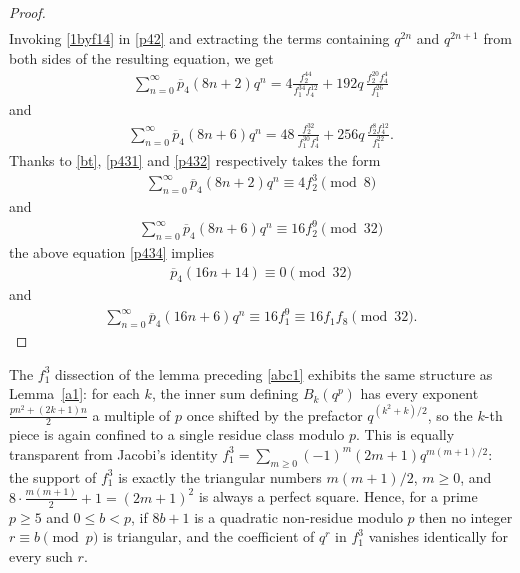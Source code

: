 \documentclass[11pt, reqno]{amsart}
\numberwithin{equation}{section}
\begin{document}
\begin{proof}
\begin{align}
		\end{align}
		Invoking \eqref{1byf14} in \eqref{p42} and extracting the terms containing $q^{2n}$ and $q^{2n+1}$ from both sides of the resulting equation, we get
		\begin{align}
			\sum_{n=0}^{\infty}\overline{p}_{4}(8n+2)q^n=4\frac{f_2^{44}}{f_1^{34}f_4^{12}}+
			192q\,\frac{f_2^{20}f_4^{4}}{f_1^{26}}\label{p431}
		\end{align}
		and
		\begin{align}
			\sum_{n=0}^{\infty}\overline{p}_{4}(8n+6)q^n=48\,\frac{f_2^{32}}{f_1^{30}f_4^{4}}+
			256q\,\frac{f_2^{8}f_4^{12}}{f_1^{22}}.\label{p432}
		\end{align}
		Thanks to \eqref{bt}, \eqref{p431} and \eqref{p432} respectively takes the form
		\begin{align}
			\sum_{n=0}^{\infty}\overline{p}_{4}(8n+2)q^n\equiv4f_2^{3}\pmod{8}\label{p433}
		\end{align}
		and 
		\begin{align}
			\sum_{n=0}^{\infty}\overline{p}_{4}(8n+6)q^n\equiv16f_2^{9}\pmod{32}\label{p434}
		\end{align}
		the above equation \eqref{p434} implies 
		\begin{align}
			\overline{p}_{4}(16n+14)\equiv0\pmod{32}\label{p435}
		\end{align}
		and
		\begin{align}
			\sum_{n=0}^{\infty}\overline{p}_{4}(16n+6)q^n\equiv 16f_1^{9}\equiv 16f_1f_8\pmod{32}.\label{p436}
		\end{align}
		
	\end{proof}
	
	The $f_1^3$ dissection of the lemma preceding \eqref{abc1} exhibits the same
	structure as Lemma~\ref{a1}: for each $k$, the inner sum defining $B_k(q^p)$ has
	every exponent $\frac{pn^2+(2k+1)n}{2}$ a multiple of $p$ once shifted by the
	prefactor $q^{(k^2+k)/2}$, so the $k$-th piece is again confined to a single
	residue class modulo $p$. This is equally transparent from Jacobi's identity
	$f_1^3=\sum_{m\ge0}(-1)^m(2m+1)q^{m(m+1)/2}$: the support of $f_1^3$ is exactly
	the triangular numbers $m(m+1)/2$, $m\ge0$, and $8\cdot\frac{m(m+1)}{2}+1=(2m+1)^2$
	is always a perfect square. Hence, for a prime $p\ge5$ and $0\le b<p$, if $8b+1$
	is a quadratic non-residue modulo $p$ then no integer $r\equiv b\pmod p$ is
	triangular, and the coefficient of $q^r$ in $f_1^3$ vanishes identically for
	every such $r$.
	
\end{document}
